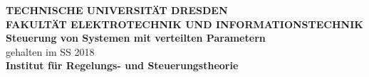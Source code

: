 

\pagestyle{empty}

\begin{center}
	\Large \textbf{TECHNISCHE UNIVERSITÄT DRESDEN \\ \vspace{1.5cm} FAKULTÄT ELEKTROTECHNIK UND INFORMATIONSTECHNIK\\ \vspace{4cm}
 {\Huge Steuerung von Systemen mit verteilten Parametern}}\\
	\vspace{4cm}
	gehalten im SS 2018 \\ \vspace{1cm}
 \textbf{Institut für Regelungs- und Steuerungstheorie}\\
\vspace{2cm}

\end{center}
\newpage
